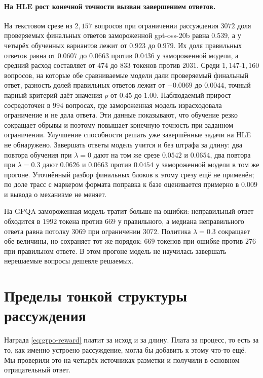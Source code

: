 \documentclass[11pt]{article}
\begin{document}
\paragraph{На HLE рост конечной точности вызван завершением ответов.} На текстовом срезе из $2{,}157$ вопросов при ограничении рассуждения $3072$ доля проверяемых финальных ответов замороженной gpt-oss-20b равна $0.539$, а у четырёх обученных вариантов лежит от $0.923$ до $0.979$. Их доля правильных ответов равна от $0.0607$ до $0.0663$ против $0.0436$ у замороженной модели, а средний расход составляет от $474$ до $833$ токенов против $2031$. Среди $1{,}147$-$1{,}160$ вопросов, на которые обе сравниваемые модели дали проверяемый финальный ответ, разность долей правильных ответов лежит от $-0.0069$ до $0.0044$, точный парный критерий даёт значения $p$ от $0.45$ до $1.00$. Наблюдаемый прирост сосредоточен в $994$ вопросах, где замороженная модель израсходовала ограничение и не дала ответа. Эти данные показывают, что обучение резко сокращает обрывы и поэтому повышает конечную точность при заданном ограничении. Улучшение способности решать уже завершённые задачи на HLE не обнаружено. Завершать ответы модель учится и без штрафа за длину: два повтора обучения при $\lambda=0$ дают на том же срезе $0.0542$ и $0.0654$, два повтора при $\lambda=0.3$ дают $0.0626$ и $0.0663$ против $0.0454$ у замороженной модели в том же прогоне. Уточнённый разбор финальных блоков к этому срезу ещё не применён; по доле трасс с маркером формата поправка к базе оценивается примерно в $0.009$ и вывода о механизме не меняет.

На GPQA замороженная модель тратит больше на ошибки: неправильный ответ обходится в $1992$ токена против $669$ у правильного, а медиана неправильного ответа равна потолку $3069$ при ограничении $3072$. Политика $\lambda=0.3$ сокращает обе величины, но сохраняет тот же порядок: $669$ токенов при ошибке против $276$ при правильном ответе. В этом прогоне модель не научилась завершать нерешаемые вопросы дешевле решаемых.

\section{Пределы тонкой структуры рассуждения}
\label{sec:labels}

Награда \eqref{eq:grpo-reward} платит за исход и за длину. Плата за процесс, то есть за то, как именно устроено рассуждение, могла бы добавить к этому что-то ещё. Мы проверили это на четырёх источниках разметки и получили в основном отрицательный ответ.
\end{document}
